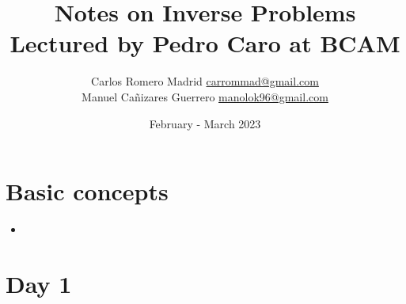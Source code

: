\documentclass{article}
\title{Notes on Inverse Problems \\ \large Lectured by Pedro Caro at BCAM}
\author{Carlos Romero Madrid  \small \href{mailto:carrommad@gmail.com}{carrommad@gmail.com} \\
Manuel Cañizares Guerrero  \small \href{mailto:manolok96@gmail.com}{manolok96@gmail.com}}
\date{February - March 2023}
\begin{document}
\maketitle


\section*{Basic concepts}
\label{sec:basic}
\begin{itemize}
    \item 
\end{itemize}


\section*{Day 1}
\end{document}
